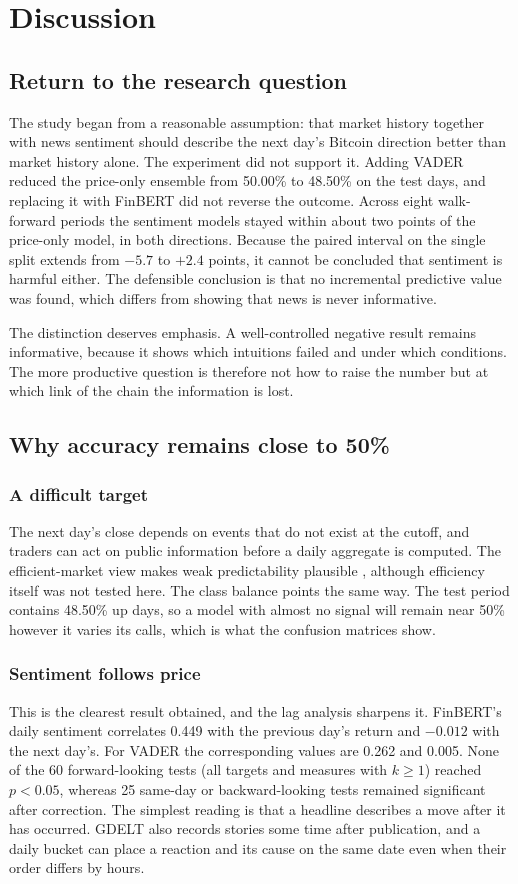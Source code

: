 \section{Discussion}
\label{ch:discussion}
\subsection{Return to the research question}
The study began from a reasonable assumption: that market history together with news sentiment should describe the next day's Bitcoin direction better than market history alone. The experiment did not support it. Adding VADER reduced the price-only ensemble from 50.00\% to 48.50\% on the test days, and replacing it with FinBERT did not reverse the outcome. Across eight walk-forward periods the sentiment models stayed within about two points of the price-only model, in both directions. Because the paired interval on the single split extends from $-5.7$ to $+2.4$ points, it cannot be concluded that sentiment is harmful either. The defensible conclusion is that no incremental predictive value was found, which differs from showing that news is never informative.

The distinction deserves emphasis. A well-controlled negative result remains informative, because it shows which intuitions failed and under which conditions. The more productive question is therefore not how to raise the number but at which link of the chain the information is lost.

\subsection{Why accuracy remains close to 50\%}
\subsubsection{A difficult target}
The next day's close depends on events that do not exist at the cutoff, and traders can act on public information before a daily aggregate is computed. The efficient-market view makes weak predictability plausible \cite{fama1970}, although efficiency itself was not tested here. The class balance points the same way. The test period contains 48.50\% up days, so a model with almost no signal will remain near 50\% however it varies its calls, which is what the confusion matrices show.

\subsubsection{Sentiment follows price}
This is the clearest result obtained, and the lag analysis sharpens it. FinBERT's daily sentiment correlates 0.449 with the previous day's return and $-0.012$ with the next day's. For VADER the corresponding values are 0.262 and 0.005. None of the 60 forward-looking tests (all targets and measures with $k\geq1$) reached $p<0.05$, whereas 25 same-day or backward-looking tests remained significant after correction. The simplest reading is that a headline describes a move after it has occurred. GDELT also records stories some time after publication, and a daily bucket can place a reaction and its cause on the same date even when their order differs by hours.


